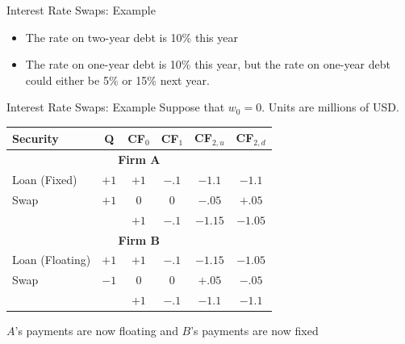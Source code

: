 \documentclass{beamer}
\begin{document}
\begin{frame}{Interest Rate Swaps: Example}
    \begin{itemize}
        \item The rate on two-year debt is 10\% this year
        \item The rate on one-year debt is 10\% this year, but the rate on one-year debt could either be 5\% or 15\% next year. 
    \end{itemize}
    \begin{center}
    \end{center}
\end{frame}

\begin{frame}{Interest Rate Swaps: Example}
    Suppose that $w_{0}=0$. Units are millions of USD.
    \begin{center}
        \begin{tabular}{lccccc}
            Security & Q & CF$_{0}$ & CF$_{1}$ & CF$_{2,u}$ & CF$_{2,d}$\\ \hline
            \multicolumn{6}{c}{\textbf{Firm A}} \\ \hline
            Loan (Fixed) & $+1$ & $+1$ & $-.1$ & $-1.1$ & $-1.1$ \\
            Swap & $+1$ & $0$ & $0$ & $-.05$ & $+.05$ \\ \hline
            & & $+1$ & $-.1$ & $-1.15$ & $-1.05$\\ \hline
            \multicolumn{6}{c}{\textbf{Firm B}} \\ \hline
            Loan (Floating) & $+1$ & $+1$ & $-.1$ & $-1.15$ & $-1.05$ \\
            Swap & $-1$ & $0$ & $0$ & $+.05$ & $-.05$ \\ \hline
            & & $+1$ & $-.1$ & $-1.1$ & $-1.1$
        \end{tabular}
    \end{center}
    $A$'s payments are now floating and $B$'s payments are now fixed
\end{frame}
\end{document}
